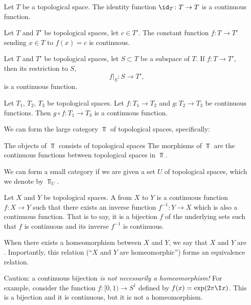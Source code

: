 \begin{example}
Let $T$ be a topological space. The identity function $\id_{T}\colon T\to T$
is a continuous function.
\end{example}

\begin{example}
Let $T$ and $T'$ be topological spaces, let $c\in T'$.
The constant function $f\colon T\to T'$ sending $x\in T$ to $f(x)=c$
is continuous.
\end{example}

\begin{theorem}
Let $T$ and $T'$ be topological spaces, let $S\subset T$ be a subspace
of $T$. If $f\colon T\to T'$, then its restriction to $S$,
$$f|_{S}\colon S\to T',$$
is a continuous function.
\end{theorem}

\begin{theorem}
Let $T_{1}$, $T_{2}$, $T_{3}$ be topological spaces.
Let $f\colon T_{1}\to T_{2}$ and $g\colon T_{2}\to T_{3}$ be
continuous functions.
Then $g\circ f\colon T_{1}\to T_{3}$ is a continuous function.
\end{theorem}

\begin{remark}
We can form the large category $\Top$ of topological spaces, specifically:
\begin{itemize}
 The objects of $\Top$ consists of topological spaces
 The morphisms of $\Top$ are the continuous
  functions between topological spaces in $\Top$.
\end{itemize}%
We can form a small category if we are given a set $U$ of topological
spaces, which we denote by $\Top_{U}$.
\end{remark}

\begin{definition}
Let $X$ and $Y$ be topological spaces. A  from
$X$ to $Y$ is a continuous function $f\colon X\to Y$ such that there
exists an inverse function $f^{-1}\colon Y\to X$ which is also a
continuous function. That is to say, it is a bijection $f$ of the
underlying sets such that $f$ is continuous and its inverse $f^{-1}$
is continuous.

When there exists a homeomorphism between $X$ and $Y$, we say that $X$
and $Y$ are . Importantly, this relation (``$X$
and $Y$ are homeomorphic'') forms an equivalence relation.

Caution: a continuous bijection \emph{is not necessarily a homeomorphism!}
For example, consider the function $f\colon[0,1)\to S^{1}$ defined by
$f(x)=\exp(2\pi\I x)$. This is a bijection and it is continuous, but
it is not a homeomorphism.
\end{definition}

